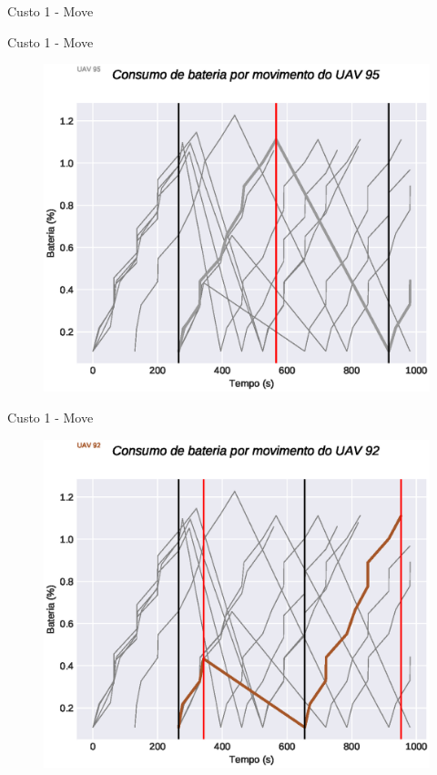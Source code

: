 \begin{frame}{Custo 1 - Move}
\begin{figure}[!htb]
                 \end{figure}
            \end{frame}\begin{frame}{Custo 1 - Move}
                \begin{figure}[!htb]
                     \includegraphics[width=\textwidth]{custo_1/uav_move_acum_uav_9.eps}
                 \end{figure}
            \end{frame}\begin{frame}{Custo 1 - Move}
                \begin{figure}[!htb]
                     \includegraphics[width=\textwidth]{custo_1/uav_move_acum_uav_6.eps}

\end{figure}
\end{frame}
